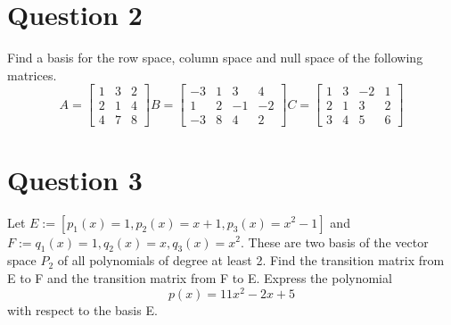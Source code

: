 \documentclass{article}
\begin{document}
\newpage
\section*{Question 2}
Find a basis for the row space, column space and null space of the following matrices.
$$
A = \begin{bmatrix} 1 & 3 & 2 \\ 2 & 1 & 4 \\ 4 & 7 & 8 \end{bmatrix}
B = \begin{bmatrix} -3 & 1 & 3 & 4 \\ 1 & 2 & -1 & -2 \\ -3 & 8 & 4 & 2 \end{bmatrix}
C = \begin{bmatrix} 1 & 3 & -2 & 1 \\ 2 & 1 & 3 & 2 \\ 3 & 4 & 5 & 6 \end{bmatrix}
$$

\newpage
\section*{Question 3}
Let $E := [p_{1}(x) = 1, p_{2}(x) = x + 1, p_{3}(x) = x^2 - 1]$ and $F := q_{1}(x) = 1, q_{2}(x) = x, q_{3}(x) = x^2$.
These are two basis of the vector space $P_2$ of all polynomials of degree at least 2. 
Find the transition matrix from E to F and the transition matrix from F to E.
Express the polynomial $$p(x) = 11x^2 - 2x + 5$$ with respect to the basis E.
\end{document}
